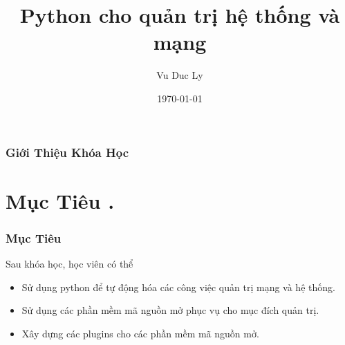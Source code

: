 \documentclass{beamer}
\title[Python cho quản trị hệ thống và mạng]{Python cho quản trị hệ thống và mạng } %
\author{Vu Duc Ly} %
\date{\today} %
\begin{document}
\begin{frame}
\titlepage %
\hyperlink{intro}{}
\end{frame}

\begin{frame}[label=intro]
\frametitle{Giới Thiệu Khóa Học} %
\tableofcontents %
\end{frame}


\section{Mục Tiêu .} 
\begin{frame}[label=muctieu]
\frametitle{Mục Tiêu}
Sau khóa học, học viên có thể
\begin{itemize}
\item Sử dụng python để tự động hóa các công việc quản trị mạng và hệ thống.
\item Sử dụng các phần mềm mã nguồn mở phục vụ cho mục đích quản trị.
\item Xây dựng các plugins cho các phần mềm mã nguồn mở.
\end{itemize} 


\end{frame}
\end{document}
